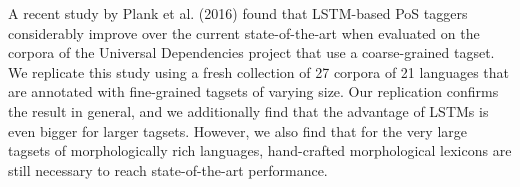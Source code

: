 A recent study by Plank et al. (2016) found that LSTM-based PoS taggers considerably improve over the current state-of-the-art when evaluated on the corpora of the Universal Dependencies project that use a coarse-grained tagset. We replicate this study using a fresh collection of 27 corpora of 21 languages that are annotated with fine-grained tagsets of varying size. Our replication confirms the result in general, and we additionally find that the advantage of LSTMs is even bigger for larger tagsets. However, we also find that for the very large tagsets of morphologically rich languages, hand-crafted morphological lexicons are still necessary to reach state-of-the-art performance.
